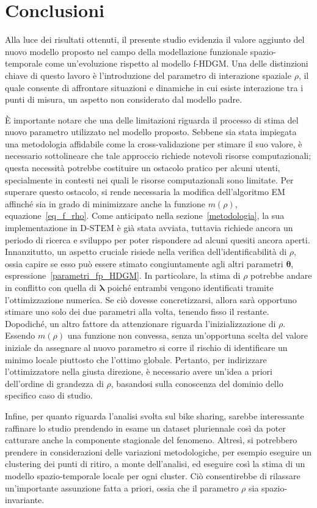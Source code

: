 \chapter[Conclusioni]{Conclusioni}

Alla luce dei risultati ottenuti, il presente studio evidenzia il valore aggiunto del nuovo modello proposto nel campo della modellazione funzionale spazio-temporale come un'evoluzione rispetto al modello f-HDGM. Una delle distinzioni chiave di questo lavoro è l'introduzione del parametro di interazione spaziale $\rho$, il quale consente di affrontare situazioni e dinamiche in cui esiste interazione tra i punti di misura, un aspetto non considerato dal modello padre.
\par È importante notare che una delle limitazioni riguarda il processo di stima del nuovo parametro utilizzato nel modello proposto. Sebbene sia stata impiegata una metodologia affidabile come la cross-validazione per stimare il suo valore, è necessario sottolineare che tale approccio richiede notevoli risorse computazionali; questa necessità potrebbe costituire un ostacolo pratico per alcuni utenti, specialmente in contesti nei quali le risorse computazionali sono limitate. Per superare questo ostacolo, si rende necessaria la modifica dell'algoritmo EM affinché sia in grado di minimizzare anche la funzione $m(\rho)$, equazione~\ref{eq_f_rho}. Come anticipato nella sezione~\ref{metodologia}, la sua implementazione in D-STEM è già stata avviata, tuttavia richiede ancora un periodo di ricerca e sviluppo per poter rispondere ad alcuni quesiti ancora aperti. Innanzitutto, un aspetto cruciale risiede nella verifica dell'identificabilità di $\rho$, ossia capire se esso può essere stimato congiuntamente agli altri parametri $\boldsymbol{\theta}$, espressione~\ref{parametri_fp_HDGM}. In particolare, la stima di $\rho$ potrebbe andare in conflitto con quella di $\boldsymbol{\lambda}$ poiché entrambi vengono identificati tramite l'ottimizzazione numerica. Se ciò dovesse concretizzarsi, allora sarà opportuno stimare uno solo dei due parametri alla volta, tenendo fisso il restante. Dopodiché, un altro fattore da attenzionare riguarda l'inizializzazione di $\rho$. Essendo $m(\rho)$ una funzione non convessa, senza un'opportuna scelta del valore iniziale da assegnare al nuovo parametro si corre il rischio di identificare un minimo locale piuttosto che l'ottimo globale. Pertanto, per indirizzare l'ottimizzatore nella giusta direzione, è necessario avere un'idea a priori dell'ordine di grandezza di $\rho$, basandosi sulla conoscenza del dominio dello specifico caso di studio.
\par Infine, per quanto riguarda l'analisi svolta sul bike sharing, sarebbe interessante raffinare lo studio prendendo in esame un dataset pluriennale così da poter catturare anche la componente stagionale del fenomeno. Altresì, si potrebbero prendere in considerazioni delle variazioni metodologiche, per esempio eseguire un clustering dei punti di ritiro, a monte dell'analisi, ed eseguire così la stima di un modello spazio-temporale locale per ogni cluster. Ciò consentirebbe di rilassare un'importante assunzione fatta a priori, ossia che il parametro $\rho$ sia spazio-invariante.
